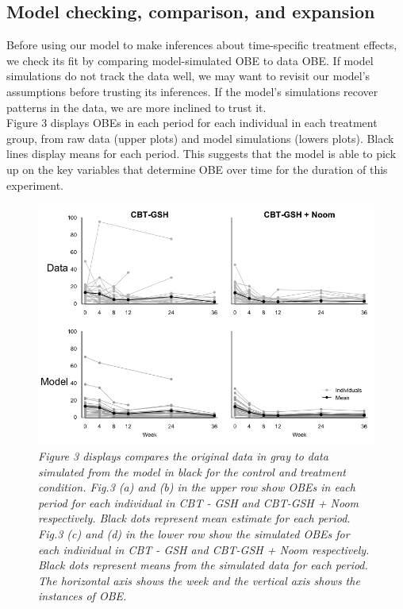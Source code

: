 \documentclass{article}
\begin{document}
\subsection{Model checking, comparison, and expansion}
Before using our model to make inferences about time-specific treatment effects, we check its fit by comparing model-simulated OBE to data OBE.  If model simulations do not track the data well, we may want to revisit our model's assumptions before trusting its inferences.  If the model's simulations recover patterns in the data, we are more inclined to trust it. \\
Figure 3 displays OBEs in each period for each individual in each treatment group, from raw data (upper plots) and model simulations (lowers plots).  Black lines display means for each period.  This suggests that the model is able to pick up on the key variables that determine OBE over time for the duration of this experiment.
%
\begin{figure}[H]
\begin{center}
\includegraphics[width=\textwidth, height=\textheight, keepaspectratio]{ppc_sims.png}
\caption{\emph{ Figure 3 displays compares the original data in gray to data simulated from the model in black for the control and treatment condition. Fig.3 (a) and (b) in the upper row show OBEs in each period for each individual in CBT - GSH and CBT-GSH + Noom respectively. Black dots represent mean estimate for each  period. Fig.3 (c) and (d) in the lower row show the simulated OBEs for each individual in CBT - GSH and CBT-GSH + Noom respectively. Black dots represent means from the simulated data for each period. The horizontal axis shows the week and the vertical axis shows the instances of OBE.}}
\end{center}
\end{figure}
\end{document}
